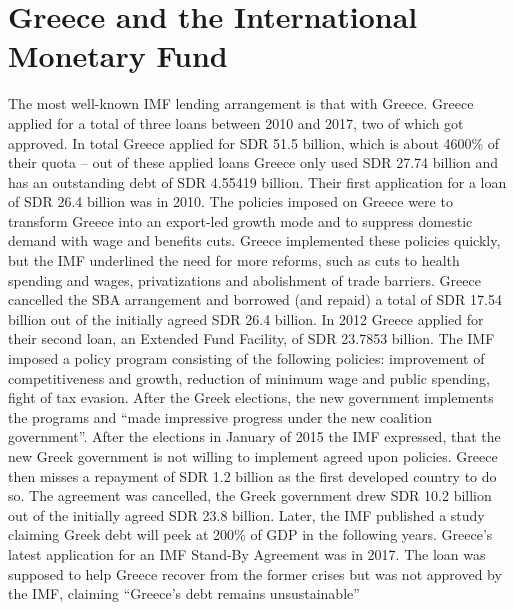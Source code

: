 \section{Greece and the International Monetary Fund}
\label{sec:greece}
The most well-known \gls{IMF} lending arrangement is that with Greece. Greece applied for a total of three loans between 2010 and 2017, two of which got approved. In total Greece applied for \gls{SDR} 51.5 billion, which is about 4600\% of their quota – out of these applied loans Greece only used \gls{SDR} 27.74 billion and has an outstanding debt of \gls{SDR} 4.55419 billion. 
Their first application for a loan of \gls{SDR} 26.4 billion was in 2010. The policies imposed on Greece were to transform Greece into an export-led growth mode and to suppress domestic demand with wage and benefits cuts. Greece implemented these policies quickly, but the \gls{IMF} underlined the need for more reforms, such as cuts to health spending and wages, privatizations and abolishment of trade barriers. Greece cancelled the SBA arrangement and borrowed (and repaid) a total of \gls{SDR} 17.54 billion out of the initially agreed \gls{SDR} 26.4 billion.\cite{WikipediaGreeceand2020}
In 2012 Greece applied for their second loan, an Extended Fund Facility, of \gls{SDR} 23.7853 billion. The \gls{IMF} imposed a policy program consisting of the following policies: improvement of competitiveness and growth, reduction of minimum wage and public spending, fight of tax evasion. After the Greek elections, the new government implements the programs and “made impressive progress under the new coalition government”.\cite{InternationalMonetaryFundIMFSurvey2013} After the elections in January of 2015 the \gls{IMF} expressed, that the new Greek government is not willing to implement agreed upon policies. Greece then misses a repayment of \gls{SDR} 1.2 billion as the first developed country to do so.\cite{CasertElenaBecatorosandRafGreecefails2015} The agreement was cancelled, the Greek government drew \gls{SDR} 10.2 billion out of the initially agreed \gls{SDR} 23.8 billion. Later, the \gls{IMF} published a study claiming Greek debt will peek at 200\% of GDP in the following years.\cite{InternationalMonetaryFund.EuropeanDept2015}
Greece’s latest application for an \gls{IMF} Stand-By Agreement was in 2017. The loan was supposed to help Greece recover from the former crises but was not approved by the \gls{IMF}, claiming “Greece’s debt remains unsustainable”\cite{InternationalMonetaryFundIMFExecutive2017}
